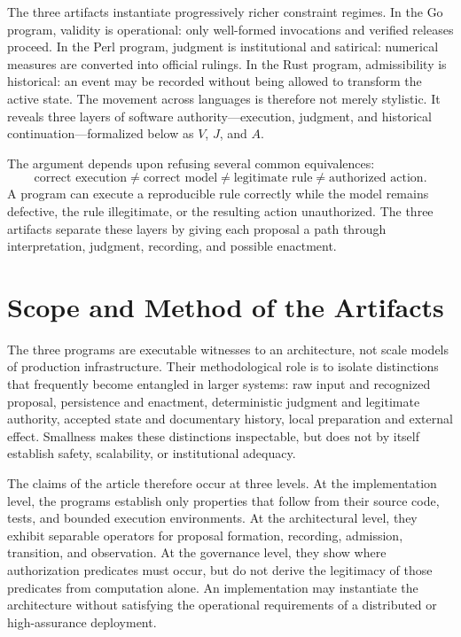 \documentclass[11pt]{article}
\begin{document}
The three artifacts instantiate progressively richer constraint regimes. In the Go program, validity is operational: only well-formed invocations and verified releases proceed. In the Perl program, judgment is institutional and satirical: numerical measures are converted into official rulings. In the Rust program, admissibility is historical: an event may be recorded without being allowed to transform the active state. The movement across languages is therefore not merely stylistic. It reveals three layers of software authority---execution, judgment, and historical continuation---formalized below as $V$, $J$, and $A$.

The argument depends upon refusing several common equivalences:
\begin{equation}
  \text{correct execution} \neq \text{correct model} \neq
  \text{legitimate rule} \neq \text{authorized action}.
  \label{eq:correctness-chain}
\end{equation}
A program can execute a reproducible rule correctly while the model remains defective, the rule illegitimate, or the resulting action unauthorized. The three artifacts separate these layers by giving each proposal a path through interpretation, judgment, recording, and possible enactment.

\section{Scope and Method of the Artifacts}

The three programs are executable witnesses to an architecture, not scale models of production infrastructure. Their methodological role is to isolate distinctions that frequently become entangled in larger systems: raw input and recognized proposal, persistence and enactment, deterministic judgment and legitimate authority, accepted state and documentary history, local preparation and external effect. Smallness makes these distinctions inspectable, but does not by itself establish safety, scalability, or institutional adequacy.

The claims of the article therefore occur at three levels. At the implementation level, the programs establish only properties that follow from their source code, tests, and bounded execution environments. At the architectural level, they exhibit separable operators for proposal formation, recording, admission, transition, and observation. At the governance level, they show where authorization predicates must occur, but do not derive the legitimacy of those predicates from computation alone. An implementation may instantiate the architecture without satisfying the operational requirements of a distributed or high-assurance deployment.
\end{document}
